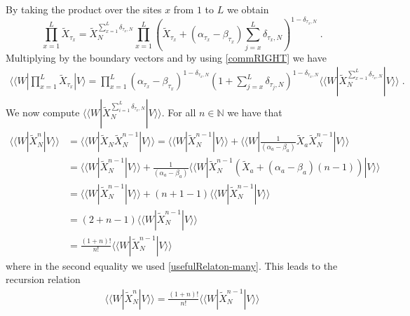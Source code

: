 \documentclass[10pt]{article}
\numberwithin{equation}{section}
\numberwithin{equation}{subsection}
\newcommand{\dt}{\;.}
\begin{document}
By taking the product over the sites $x$ from $1$ to $L$ we obtain 
\begin{equation}
	\prod_{x=1}^{L}\widetilde{X}_{\tau_{x}}=\widetilde{X}_{N}^{\sum_{x=1}^{L}\delta_{\tau_{x},N}}\prod_{x=1}^{L}\left(\widetilde{X}_{\tau_{x}}+(\alpha_{\tau_{x}}-\beta_{\tau_{x}})\sum_{j=x}^{L}\delta_{\tau_{x},N}\right)^{1-\delta_{\tau_{x},N}}\dt
\end{equation}
Multiplying by the boundary vectors and by using \eqref{commRIGHT} we have 
\begin{align}
	 \langle \langle W|  \prod_{x=1}^{L}\widetilde{X}_{\tau_{x}}
	|V \rangle=
	\prod_{x=1}^{L}\left(\alpha_{\tau_{x}}-\beta_{\tau_{x}}\right)^{1-\delta_{\tau_{x},N}}\left(1+\sum_{j=x}^{L}\delta_{\tau_{j},N}\right)^{1-\delta_{\tau_{x},N}} \langle \langle W|  \widetilde{X}_{N}^{\sum_{x=1}^{L}\delta_{\tau_{x},N}} |V\rangle\rangle  \dt
\end{align}
We now compute $ \langle \langle W|  \widetilde{X}_{N}^{\sum_{i=1}^{L}\delta_{\tau_{x},N}} |V\rangle\rangle $. For all $n\in \mathbb{N}$ we have that  
\begin{align}
	 \langle \langle W|  \widetilde{X}_{N}^{n} |V\rangle\rangle &= \langle \langle W|  \widetilde{X}_{N}\widetilde{X}_{N}^{n-1} |V\rangle\rangle = \langle \langle W|  \widetilde{X}_{N}^{n-1} |V\rangle\rangle  + \langle \langle W|  \frac{1}{(\alpha_{a}-\beta_{a})}\widetilde{X}_{a}\widetilde{X}_{N}^{n-1} |V\rangle\rangle \nonumber
	\\&=
	 \langle \langle W|  \widetilde{X}_{N}^{n-1} |V\rangle\rangle +\frac{1}{(\alpha_{a}-\beta_{a})} \langle \langle W|  \widetilde{X}_{N}^{n-1}\left(\widetilde{X}_{a}+(\alpha_{a}-\beta_{a})(n-1)\right) |V\rangle\rangle \nonumber
	\\&=
	 \langle \langle W|  \widetilde{X}_{N}^{n-1} |V\rangle\rangle +\left(n+1-1\right) \langle \langle W|  \widetilde{X}_{N}^{n-1} |V\rangle\rangle \nonumber
	\\&=
	\left(2+n-1\right) \langle \langle W|  \widetilde{X}_{N}^{n-1} |V\rangle\rangle \nonumber
	\\&=
	\frac{(1+n)!}{n!} \langle \langle W|  \widetilde{X}_{N}^{n-1} |V\rangle\rangle 
\end{align}
where in the second equality we used \eqref{usefulRelaton-many}. 
This leads to the recursion relation
\begin{align}
		 \langle \langle W|  \widetilde{X}_{N}^{n} |V\rangle\rangle =\frac{(1+n)!}{n!} \langle \langle W|  \widetilde{X}_{N}^{n-1} |V\rangle\rangle 
\end{align}
\end{document}
